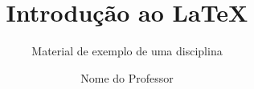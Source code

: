\documentclass[aspectratio=169, xcolor=table]{beamer}
\title{Introdução ao \LaTeX}
\subtitle{Material de exemplo de uma disciplina}
\author{Nome do Professor}
\institute{Nome da Instituição}
\date{\the\year}
\begin{document}
\begin{frame}
  \titlepage
\end{frame}



\end{document}
